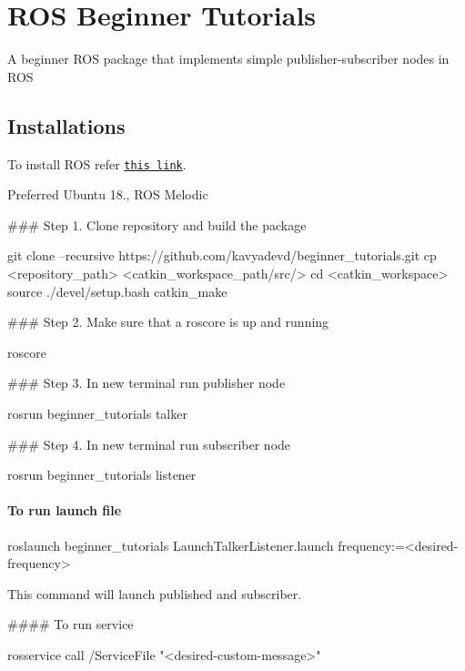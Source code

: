 \href{https://opensource.org/licenses/MIT}{\tt } \section*{R\+OS Beginner Tutorials}

A beginner R\+OS package that implements simple publisher-\/subscriber nodes in R\+OS

\subsection*{Installations}

To install R\+OS refer \href{http://wiki.ros.org/ROS/Installation}{\tt this link}.

Preferred Ubuntu 18., R\+OS Melodic

\#\#\# Step 1. Clone repository and build the package 
\begin{DoxyCode}
git clone --recursive https://github.com/kavyadevd/beginner\_tutorials.git
cp <repository\_path> <catkin\_workspace\_path/src/>
cd <catkin\_workspace>
source ./devel/setup.bash
catkin\_make
\end{DoxyCode}


\#\#\# Step 2. Make sure that a roscore is up and running 
\begin{DoxyCode}
roscore
\end{DoxyCode}
 \#\#\# Step 3. In new terminal run publisher node 
\begin{DoxyCode}
rosrun beginner\_tutorials talker
\end{DoxyCode}
 \#\#\# Step 4. In new terminal run subscriber node 
\begin{DoxyCode}
rosrun beginner\_tutorials listener
\end{DoxyCode}


\paragraph*{To run launch file}


\begin{DoxyCode}
roslaunch beginner\_tutorials LaunchTalkerListener.launch frequency:=<desired-frequency>
\end{DoxyCode}
 This command will launch published and subscriber.

\#\#\#\# To run service 
\begin{DoxyCode}
rosservice call /ServiceFile "<desired-custom-message>"
\end{DoxyCode}


